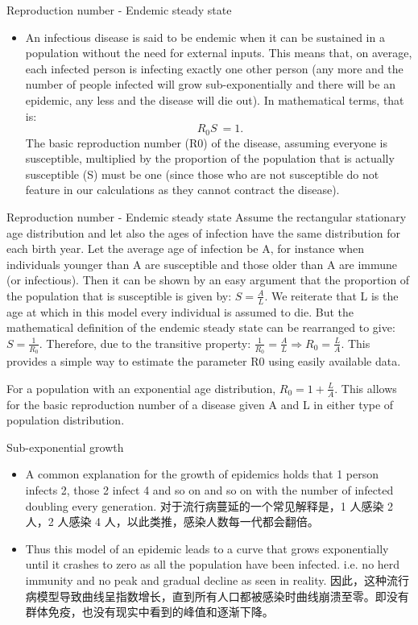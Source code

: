 \documentclass[
  notheorems,
  aspectratio=54,
]{beamer}
\begin{document}
\begin{frame}{Reproduction number - Endemic steady state}
  \begin{itemize}
    \item An infectious disease is said to be endemic when it can be sustained in a population without the need for external inputs. This means that, on average, each infected person is infecting exactly one other person (any more and the number of people infected will grow sub-exponentially and there will be an epidemic, any less and the disease will die out). In mathematical terms, that is: 
      $${\displaystyle \ R_{0}S\ =1}.$$
    The basic reproduction number (R0) of the disease, assuming everyone is susceptible, multiplied by the proportion of the population that is actually susceptible (S) must be one (since those who are not susceptible do not feature in our calculations as they cannot contract the disease).
  \end{itemize}
\end{frame}

\begin{frame}{Reproduction number - Endemic steady state}
  Assume the rectangular stationary age distribution and let also the ages of infection have the same distribution for each birth year. Let the average age of infection be A, for instance when individuals younger than A are susceptible and those older than A are immune (or infectious). Then it can be shown by an easy argument that the proportion of the population that is susceptible is given by:
${\displaystyle S={\frac {A}{L}}.}$
We reiterate that L is the age at which in this model every individual is assumed to die. But the mathematical definition of the endemic steady state can be rearranged to give:
${\displaystyle S={\frac {1}{R_{0}}}.}$
Therefore, due to the transitive property:
${\displaystyle {\frac {1}{R_{0}}}={\frac {A}{L}}\Rightarrow R_{0}={\frac {L}{A}}.}$
This provides a simple way to estimate the parameter R0 using easily available data.

For a population with an exponential age distribution,
${\displaystyle R_{0}=1+{\frac {L}{A}}.}$
This allows for the basic reproduction number of a disease given A and L in either type of population distribution.
\end{frame}


\begin{frame}{Sub-exponential growth}
  \begin{itemize}
    \item A common explanation for the growth of epidemics holds that 1 person infects 2, those 2 infect 4 and so on and so on with the number of infected doubling every generation. 对于流行病蔓延的一个常见解释是，1 人感染 2 人，2 人感染 4 人，以此类推，感染人数每一代都会翻倍。
    \item  Thus this model of an epidemic leads to a curve that grows exponentially until it crashes to zero as all the population have been infected. i.e. no herd immunity and no peak and gradual decline as seen in reality. 因此，这种流行病模型导致曲线呈指数增长，直到所有人口都被感染时曲线崩溃至零。即没有群体免疫，也没有现实中看到的峰值和逐渐下降。
  \end{itemize}
\end{frame}
\end{document}
